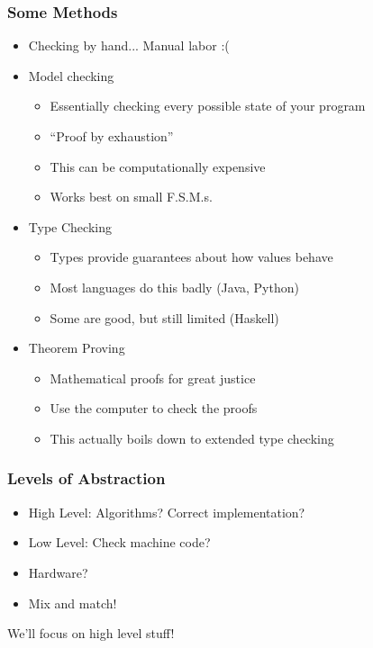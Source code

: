 \documentclass{beamer}
\begin{document}
\begin{frame}
  \frametitle{Some Methods}

  \begin{itemize}
  \item<1-> Checking by hand... Manual labor :(
  \item<2-> Model checking
    \begin{itemize}
    \item Essentially checking every possible state of your program
    \item ``Proof by exhaustion''
    \item This can be computationally expensive
    \item Works best on small F.S.M.s.
    \end{itemize}
  \item<3-> Type Checking
    \begin{itemize}
    \item Types provide guarantees about how values behave
    \item Most languages do this badly (Java, Python)
    \item Some are good, but still limited (Haskell)
    \end{itemize}
  \item<4-> Theorem Proving
    \begin{itemize}
    \item Mathematical proofs for great justice
    \item Use the computer to check the proofs
    \item This actually boils down to extended type checking
    \end{itemize}
  \end{itemize}
\end{frame}

\begin{frame}
  \frametitle{Levels of Abstraction}

  \begin{itemize}
  \item<1-> High Level: Algorithms? Correct implementation?
  \item<2-> Low Level: Check machine code?
  \item<3-> Hardware?
  \item<4-> Mix and match!
  \end{itemize}


  \alert{We'll focus on high level stuff!}
\end{frame}
\end{document}
